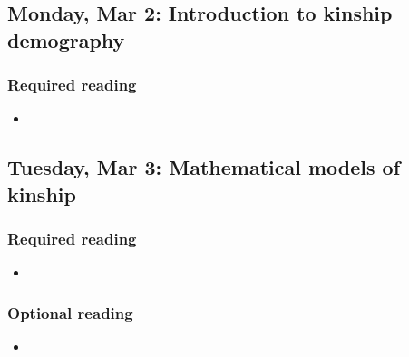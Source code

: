 ﻿\documentclass{article}
\begin{document}
\subsection*{Monday, Mar 2: Introduction to kinship demography}

\subsubsection*{Required reading}

\begin{itemize}
    \item {}
\end{itemize}



\subsection*{Tuesday, Mar 3: Mathematical models of kinship}

\subsubsection*{Required reading}

\begin{itemize}
    \item {}
\end{itemize}

\subsubsection*{Optional reading}

\begin{itemize}
    \item {}
\end{itemize}
\end{document}
